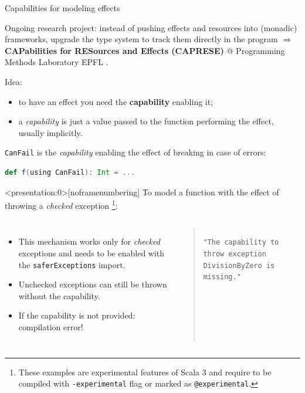 \documentclass[aspectratio=1610,xcolor=dvipsnames,handout]{beamer}
\begin{document}
%
\begin{frame}[fragile]{Capabilities for modeling effects}
  \begin{block}{}
    Ongoing research project: instead of pushing effects and resources into (monadic) frameworks, upgrade the type system to track them directly in the program $\Rightarrow$ \textbf{CAPabilities for RESources and Effects (CAPRESE)} @ Programming Methods Laboratory EPFL \cite{capabilities}.
  \end{block}
  Idea:
  \begin{itemize}
    \item to have an effect you need the \textbf{capability} enabling it;
    \item a \textit{capability} is just a value passed to the function performing the effect, usually implicitly.
  \end{itemize}
  \texttt{CanFail} is the \textit{capability} enabling the effect of breaking in case of errors:
  \begin{lstlisting}[language=scala, gobble=4]
    def f(using CanFail): Int = ...
  \end{lstlisting}
\end{frame}
%
\begin{frame}<presentation:0>[noframenumbering]
  \fontsize{8}{10}\selectfont
  To model a function with the effect of throwing a \textit{checked} exception
  \footnote{\tiny
    These examples are experimental features of Scala 3 and require to be compiled with \texttt{-experimental} flag or marked as \texttt{@experimental}.
  }:
  \begin{columns}
      
      \addtolength{\leftmargini}{\labelsep}
      \begin{itemize}
        \item This mechanism works only for \textit{checked} exceptions and needs to be enabled with the \texttt{saferExceptions} import.
        \item Unchecked exceptions can still be thrown without the capability.
        \item If the capability is not provided: compilation error!
      \end{itemize}
    \begin{quote}
      \texttt{"The capability to throw exception DivisionByZero is missing."}
    \end{quote}
  \end{columns}
\end{frame}
\end{document}
